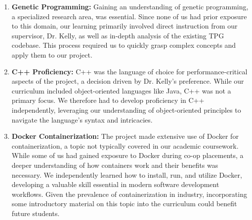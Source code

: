 \documentclass{article}
\begin{document}
\begin{enumerate}
    \item \textbf{Genetic Programming:} Gaining an understanding of genetic programming, a specialized research area, was essential. Since none of us had prior exposure to this domain, our learning primarily involved direct instruction from our supervisor, Dr. Kelly, as well as in-depth analysis of the existing TPG codebase. This process required us to quickly grasp complex concepts and apply them to our project.

    \item \textbf{C++ Proficiency:} C++ was the language of choice for performance-critical aspects of the project, a decision driven by Dr. Kelly's preference. While our curriculum included object-oriented languages like Java, C++ was not a primary focus. We therefore had to develop proficiency in C++ independently, leveraging our understanding of object-oriented principles to navigate the language's syntax and intricacies.

    \item \textbf{Docker Containerization:} The project made extensive use of Docker for containerization, a topic not typically covered in our academic coursework. While some of us had gained exposure to Docker during co-op placements, a deeper understanding of how containers work and their benefits was necessary. We independently learned how to install, run, and utilize Docker, developing a valuable skill essential in modern software development workflows. Given the prevalence of containerization in industry, incorporating some introductory material on this topic into the curriculum could benefit future students.
\end{enumerate}
\end{document}
